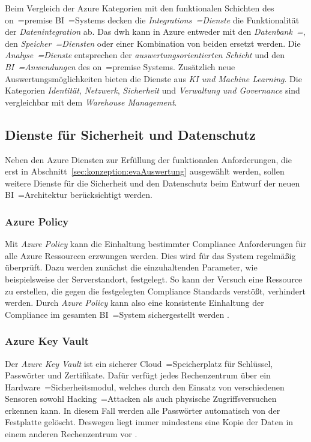 Beim Vergleich der Azure Kategorien mit den funktionalen Schichten des on~=premise BI~=Systems decken die \textit{Integrations~=Dienste} die Funktionalität der \textit{Datenintegration} ab. Das \ac{dwh} kann in Azure entweder mit den \textit{Datenbank~=}, den \textit{Speicher~=Diensten} oder einer Kombination von beiden ersetzt werden. Die \textit{Analyse~=Dienste} entsprechen der \textit{auswertungsorientierten Schicht} und den \textit{BI~=Anwendungen} des on~=premise Systems. Zusätzlich neue Auswertungsmöglichkeiten bieten die Dienste aus \textit{KI und Machine Learning}. Die Kategorien \textit{Identität}, \textit{Netzwerk}, \textit{Sicherheit} und \textit{Verwaltung und Governance} sind vergleichbar mit dem \textit{Warehouse Management}.

\subsection{Dienste für Sicherheit und Datenschutz} \label{subsec:grundlagen:azure:sicherheitUndDatenschutz}
Neben den Azure Diensten zur Erfüllung der funktionalen Anforderungen, die erst in Abschnitt~\ref{sec:konzeption:evaAuswertung} ausgewählt werden, sollen weitere Dienste für die Sicherheit und den Datenschutz beim Entwurf der neuen BI~=Architektur berücksichtigt werden.

\subsubsection{Azure Policy} \label{subsec:grundlagen:azure:sicherheitUndDatenschutz:ap}
Mit \textit{Azure Policy} kann die Einhaltung bestimmter Compliance Anforderungen für alle Azure Ressourcen erzwungen werden. Dies wird für das System regelmäßig überprüft. Dazu werden zunächst die einzuhaltenden Parameter, wie beispielsweise der Serverstandort, festgelegt. So kann der Versuch eine Ressource zu erstellen, die gegen die festgelegten Compliance Standards verstößt, verhindert werden. Durch \textit{Azure Policy} kann also eine konsistente Einhaltung der Compliance im gesamten BI~=System sichergestellt werden \cite{stefanovic_azure_2021}.

\subsubsection{Azure Key Vault} \label{subsec:grundlagen:azure:sicherheitUndDatenschutz:keyVault}
Der \textit{Azure Key Vault} ist ein sicherer Cloud~=Speicherplatz für Schlüssel, Passwörter und Zertifikate. Dafür verfügt jedes Rechenzentrum über ein Hardware~=Sicherheitsmodul, welches durch den Einsatz von verschiedenen Sensoren sowohl Hacking~=Attacken als auch physische Zugriffsversuchen erkennen kann. In diesem Fall werden alle Passwörter automatisch von der Festplatte gelöscht. Deswegen liegt immer mindestens eine Kopie der Daten in einem anderen Rechenzentrum vor \cite{haunts_key_2019}.

